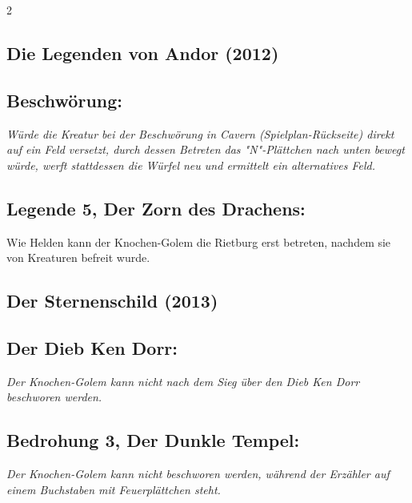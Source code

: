 \documentclass[10pt, a4paper, oneside]{book}
\newcommand{\fan}[1]{\textit{#1}}
\begin{document}
\begin{multicols*}{2}
\begin{bgcolor}
\section{Die Legenden von Andor (2012)}




\subsection{Beschwörung:}

\fan{Würde die Kreatur bei der Beschwörung in Cavern (Spielplan-Rückseite) direkt auf ein Feld versetzt, durch dessen Betreten das "N"-Plättchen nach unten bewegt würde, werft stattdessen die Würfel neu und ermittelt ein alternatives Feld.}


\subsection{Legende 5, Der Zorn des Drachens:}

Wie Helden kann der Knochen-Golem die Rietburg erst betreten, nachdem sie von Kreaturen befreit wurde.
\supercite{dh-faq}


\end{bgcolor}


\begin{bgcolor}
\section{Der Sternenschild (2013)}

\subsection{Der Dieb Ken Dorr:}

\fan{Der Knochen-Golem kann nicht nach dem Sieg über den Dieb Ken Dorr beschworen werden.}


\subsection{Bedrohung 3, Der Dunkle Tempel:}

\fan{Der Knochen-Golem kann nicht beschworen werden, während der Erzähler auf einem Buchstaben mit Feuerplättchen steht.}

\end{bgcolor}



\columnbreak





\end{multicols*}
\end{document}

